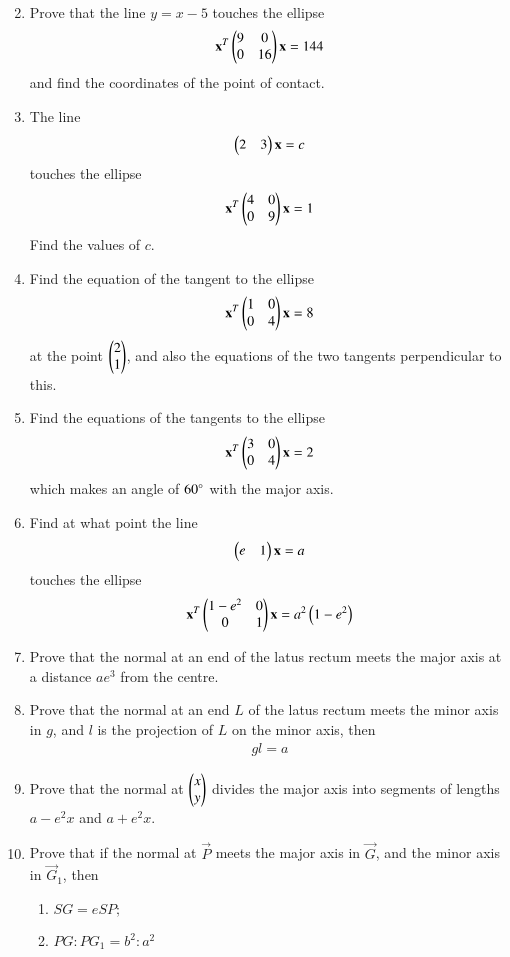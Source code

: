 \begin{enumerate}[label=\arabic*.,ref=\thesubsection.\theenumi]
\begin{align}
\end{align}
\item Prove that the line $y=x-5$ touches the ellipse
\begin{align}
\mathbf{x}^T\begin{pmatrix}9 & 0\\0& 16\end{pmatrix}\mathbf{x} = 144
\end{align}
and find the coordinates of the point of contact.
\item The line 
\begin{align}
\begin{pmatrix}2 & 3\end{pmatrix}\mathbf{x} = c
\end{align}
 touches the ellipse 
\begin{align}
\mathbf{x}^T\begin{pmatrix}4 & 0\\0& 9\end{pmatrix}\mathbf{x} = 1
\end{align}
  Find the values of $c$.
\item Find the equation of the tangent to the ellipse 
\begin{align}
\mathbf{x}^T\begin{pmatrix}1 & 0\\0& 4\end{pmatrix}\mathbf{x} = 8
\end{align}
 at the point $\begin{pmatrix}2\\1\end{pmatrix}$, and also the equations of the two tangents perpendicular to this.
\item Find the equations of the tangents to the ellipse 
\begin{align}
\mathbf{x}^T\begin{pmatrix}3 & 0\\0& 4\end{pmatrix}\mathbf{x} = 2
\end{align}
 which makes an angle of $60\degree$ with the major axis.
\item Find at what point the line 
\begin{align}
\begin{pmatrix}e & 1\end{pmatrix}\mathbf{x} = a
\end{align}
touches the ellipse
\begin{align}
\mathbf{x}^T\begin{pmatrix}1-e^2 & 0\\0& 1\end{pmatrix}\mathbf{x} = a^2\left(1-e^2\right)
\end{align}
\item Prove that the normal at an end of the latus rectum meets the major axis at a distance $ae^3$ from the centre.
\item Prove that the normal at an end $L$ of the latus rectum meets the minor axis in $g$, and $l$ is the projection of $L$ on the
minor axis, then
\begin{align}
gl=a
\end{align}
\item Prove that the normal at $\begin{pmatrix}x\\y\end{pmatrix}$ divides the major axis into segments of lengths $a-e^2x$ and $a+e^2x$.
\item Prove that if the normal at $\vec{P}$ meets the major axis in $\vec{G}$, and the minor axis in $\vec{G}_1$, then
\begin{enumerate}
\item $SG=eSP;$
\item $PG:PG_1 = b^2:a^2$
\end{enumerate}

\end{enumerate}
